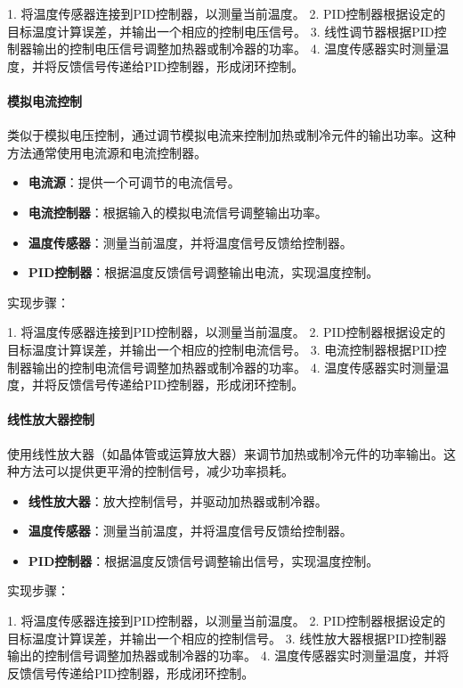 \documentclass[dvipsnames, svgnames,a4paper,11pt]{article}
\begin{document}
1. 将温度传感器连接到PID控制器，以测量当前温度。
2. PID控制器根据设定的目标温度计算误差，并输出一个相应的控制电压信号。
3. 线性调节器根据PID控制器输出的控制电压信号调整加热器或制冷器的功率。
4. 温度传感器实时测量温度，并将反馈信号传递给PID控制器，形成闭环控制。

\paragraph*{模拟电流控制}

类似于模拟电压控制，通过调节模拟电流来控制加热或制冷元件的输出功率。这种方法通常使用电流源和电流控制器。

\begin{itemize}
    \item \textbf{电流源}：提供一个可调节的电流信号。
    \item \textbf{电流控制器}：根据输入的模拟电流信号调整输出功率。
    \item \textbf{温度传感器}：测量当前温度，并将温度信号反馈给控制器。
    \item \textbf{PID控制器}：根据温度反馈信号调整输出电流，实现温度控制。
\end{itemize}

实现步骤：

1. 将温度传感器连接到PID控制器，以测量当前温度。
2. PID控制器根据设定的目标温度计算误差，并输出一个相应的控制电流信号。
3. 电流控制器根据PID控制器输出的控制电流信号调整加热器或制冷器的功率。
4. 温度传感器实时测量温度，并将反馈信号传递给PID控制器，形成闭环控制。

\paragraph*{线性放大器控制}

使用线性放大器（如晶体管或运算放大器）来调节加热或制冷元件的功率输出。这种方法可以提供更平滑的控制信号，减少功率损耗。

\begin{itemize}
    \item \textbf{线性放大器}：放大控制信号，并驱动加热器或制冷器。
    \item \textbf{温度传感器}：测量当前温度，并将温度信号反馈给控制器。
    \item \textbf{PID控制器}：根据温度反馈信号调整输出信号，实现温度控制。
\end{itemize}

实现步骤：

1. 将温度传感器连接到PID控制器，以测量当前温度。
2. PID控制器根据设定的目标温度计算误差，并输出一个相应的控制信号。
3. 线性放大器根据PID控制器输出的控制信号调整加热器或制冷器的功率。
4. 温度传感器实时测量温度，并将反馈信号传递给PID控制器，形成闭环控制。
\end{document}
